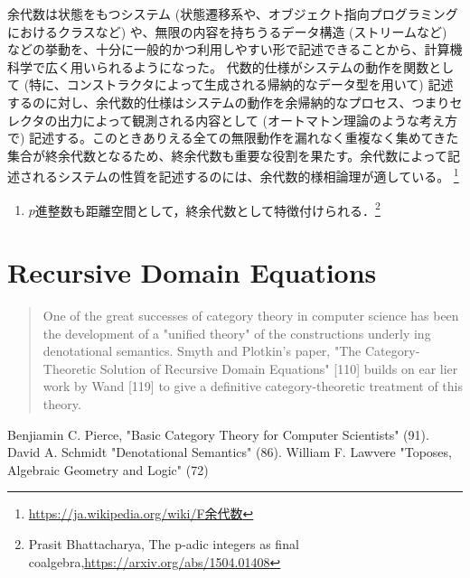 \documentclass[uplatex,dvipdfmx]{jsreport}
\begin{document}
\begin{example}[余代数の例]
    余代数は状態をもつシステム (状態遷移系や、オブジェクト指向プログラミングにおけるクラスなど) や、無限の内容を持ちうるデータ構造 (ストリームなど) などの挙動を、十分に一般的かつ利用しやすい形で記述できることから、計算機科学で広く用いられるようになった。
    代数的仕様がシステムの動作を関数として (特に、コンストラクタによって生成される帰納的なデータ型を用いて) 記述するのに対し、余代数的仕様はシステムの動作を余帰納的なプロセス、つまりセレクタの出力によって観測される内容として (オートマトン理論のような考え方で) 記述する。このときありえる全ての無限動作を漏れなく重複なく集めてきた集合が終余代数となるため、終余代数も重要な役割を果たす。余代数によって記述されるシステムの性質を記述するのには、余代数的様相論理が適している。 
    \footnote{\url{https://ja.wikipedia.org/wiki/F余代数}}
    \begin{enumerate}
        \item $p$進整数も距離空間として，終余代数として特徴付けられる．\footnote{Prasit Bhattacharya, The p-adic integers as final coalgebra,\url{https://arxiv.org/abs/1504.01408}}
    \end{enumerate}
\end{example}

\section{Recursive Domain Equations}

\begin{quotation}
    One of the great successes of category theory in computer science has been the development of a "unified theory" of the constructions underly­ ing denotational semantics. Smyth and Plotkin's paper, "The Category­ Theoretic Solution of Recursive Domain Equations" [110] builds on ear­ lier work by Wand [119] to give a definitive category-theoretic treatment of this theory.\cite{Pierce}
\end{quotation}

\begin{thebibliography}{99}
    Benjiamin C. Pierce, "Basic Category Theory for Computer Scientists" (91).
    David A. Schmidt "Denotational Semantics" (86).
    William F. Lawvere "Toposes, Algebraic Geometry and Logic" (72)
\end{thebibliography}
\end{document}
